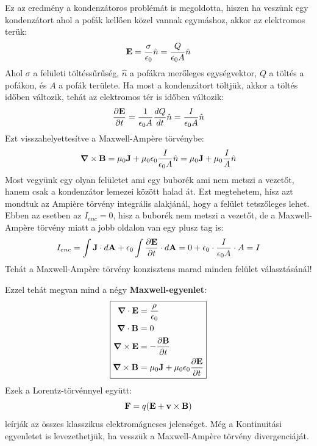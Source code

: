 \documentclass[a4paper,12pt]{article}
\begin{document}
Ez az eredmény a kondenzátoros problémát is megoldotta, hiszen ha veszünk egy kondenzátort ahol a pofák kellően közel vannak egymáshoz, akkor az elektromos terük:
\begin{equation}
    \bold{E} = \frac{\sigma}{\epsilon_0} \hat{n} = \frac{Q}{\epsilon_0 A} \hat{n}
\end{equation}
Ahol $\sigma$ a felületi töltéssűrűség, $\hat{n}$ a pofákra merőleges egységvektor, $Q$ a töltés a pofákon, és $A$ a pofák területe. Ha most a kondenzátort töltjük, akkor a töltés időben változik, tehát az elektromos tér is időben változik:
\begin{equation}
    \frac{\partial \bold{E}}{\partial t} = \frac{1}{\epsilon_0 A} \frac{dQ}{dt} \hat{n} = \frac{I}{\epsilon_0 A} \hat{n}
\end{equation}
Ezt visszahelyettesítve a Maxwell-Ampère törvénybe:
\begin{equation}
    \boldsymbol{\nabla} \times \bold{B} = \mu_0 \bold{J} + \mu_0 \epsilon_0 \frac{I}{\epsilon_0 A} \hat{n} = \mu_0 \bold{J} + \mu_0 \frac{I}{A} \hat{n}
\end{equation}
Most vegyünk egy olyan felületet ami egy buborék ami nem metszi a vezetőt, hanem csak a kondenzátor lemezei között halad át. Ezt megtehetem,
hisz azt mondtuk az Ampière törvény integrális alakjánál, hogy a felület tetszőleges lehet. Ebben az esetben az $I_{enc} = 0$, hisz a buborék nem metszi a vezetőt, de a Maxwell-Ampère törvény miatt a jobb oldalon van egy plusz tag is:
\begin{equation}
    I_{enc} = \int \bold{J} \cdot d\bold{A} + \epsilon_0 \int \frac{\partial \bold{E}}{\partial t} \cdot d\bold{A} = 0 + \epsilon_0 \cdot \frac{I}{\epsilon_0 A} \cdot A = I
\end{equation}
Tehát a Maxwell-Ampère törvény konzisztens marad minden felület választásánál!

Ezzel tehát megvan mind a négy \textbf{Maxwell-egyenlet}:
\begin{equation}
    \boxed{\begin{aligned}
        \boldsymbol{\nabla} \cdot \bold{E} &= \frac{\rho}{\epsilon_0} \\
        \boldsymbol{\nabla} \cdot \bold{B} &= 0 \\
        \boldsymbol{\nabla} \times \bold{E} &= - \frac{\partial \bold{B}}{\partial t} \\
        \boldsymbol{\nabla} \times \bold{B} &= \mu_0 \bold{J} + \mu_0 \epsilon_0 \frac{\partial \bold{E}}{\partial t}
    \end{aligned}}
\end{equation}
Ezek a Lorentz-törvénnyel együtt:
\begin{equation}
    \bold{F} = q(\bold{E} + \bold{v} \times \bold{B})
\end{equation}
leírják az összes klasszikus elektromágneses jelenséget. Még a Kontinuitási egyenletet is levezethetjük, ha vesszük a Maxwell-Ampère törvény divergenciáját.
\end{document}
